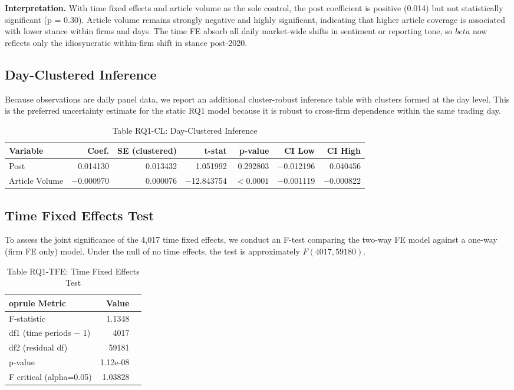 \documentclass[11pt]{article}
\def\beta{beta}%
\begin{document}
\textbf{Interpretation.} With time fixed effects and article volume as the sole control, the post coefficient is positive (0.014) but not statistically significant (p = 0.30). Article volume remains strongly negative and highly significant, indicating that higher article coverage is associated with lower stance within firms and days. The time FE absorb all daily market-wide shifts in sentiment or reporting tone, so $\beta$ now reflects only the idiosyncratic within-firm shift in stance post-2020.

\subsection*{Day-Clustered Inference}
Because observations are daily panel data, we report an additional cluster-robust inference table with clusters formed at the day level. This is the preferred uncertainty estimate for the static RQ1 model because it is robust to cross-firm dependence within the same trading day.

\begin{table}[H]
\centering
\caption*{Table RQ1-CL: Day-Clustered Inference}
\begin{tabular}{lrrrrrr}
\toprule
Variable & Coef. & SE (clustered) & t-stat & p-value & CI Low & CI High \\
\midrule
Post & 0.014130 & 0.013432 & 1.051992 & 0.292803 & $-$0.012196 & 0.040456 \\
Article Volume & $-$0.000970 & 0.000076 & $-$12.843754 & $<0.0001$ & $-$0.001119 & $-$0.000822 \\
\bottomrule
\end{tabular}
\end{table}

\subsection*{Time Fixed Effects Test}
To assess the joint significance of the 4,017 time fixed effects, we conduct an F-test comparing the two-way FE model against a one-way (firm FE only) model. Under the null of no time effects, the test is approximately $F(4017, 59180)$.

\begin{table}[H]
\centering
\caption*{Table RQ1-TFE: Time Fixed Effects Test}
\begin{tabular}{lrr}
	oprule
Metric & Value & \\
\midrule
F-statistic & 1.1348 & \\
df1 (time periods $-$ 1) & 4017 & \\
df2 (residual df) & 59181 & \\
p-value & 1.12e-08 & \\
F critical (alpha=0.05) & 1.03828 & \\
\bottomrule
\end{tabular}
\end{table}
\end{document}
